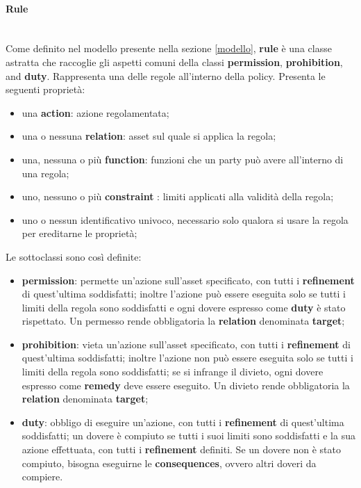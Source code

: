 \documentclass[12pt,a4paper,twoside]{book}
\begin{document}
\paragraph{Rule}\label{ODRLRulePara}\mbox{}\\
Come definito nel modello presente nella sezione \ref{modello}, \textbf{rule} è una classe astratta che raccoglie gli aspetti comuni della classi  \textbf{permission}, \textbf{prohibition}, and \textbf{duty}. Rappresenta una delle regole all'interno della policy. Presenta le seguenti proprietà:
\begin{itemize}
	\item una \textbf{action}: azione regolamentata;
	\item una o nessuna \textbf{relation}: asset sul quale si applica la regola;
	\item una, nessuna o più \textbf{function}: funzioni che un party può avere all'interno di una regola;
	\item uno, nessuno o più \textbf{constraint }: limiti applicati alla validità della regola;
	\item uno o nessun identificativo univoco, necessario solo qualora si usare la regola per ereditarne le proprietà;
\end{itemize}
Le sottoclassi sono così definite:
\begin{itemize}
	\item \textbf{permission}: permette un'azione sull'asset specificato, con tutti i \textbf{refinement} di quest'ultima soddisfatti; inoltre l'azione può essere eseguita solo se tutti i limiti della regola sono soddisfatti e ogni dovere espresso come \textbf{duty} è stato rispettato. Un permesso rende obbligatoria la \textbf{relation} denominata \textbf{target};
	\item \textbf{prohibition}: vieta un'azione sull'asset specificato, con tutti i \textbf{refinement} di quest'ultima soddisfatti; inoltre l'azione non può essere eseguita solo se tutti i limiti della regola sono soddisfatti; se si infrange il divieto, ogni dovere espresso come \textbf{remedy} deve essere eseguito. Un divieto rende obbligatoria la \textbf{relation} denominata \textbf{target};
	\item \textbf{duty}: obbligo di eseguire un'azione, con tutti i \textbf{refinement} di quest'ultima soddisfatti; un dovere è compiuto se tutti i suoi limiti sono soddisfatti e la sua azione effettuata, con tutti i \textbf{refinement} definiti. Se un dovere non è stato compiuto, bisogna eseguirne le \textbf{consequences}, ovvero altri doveri da compiere.
\end{itemize}
\end{document}
